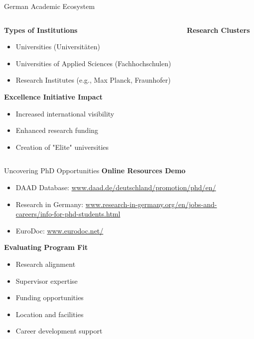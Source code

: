 \documentclass[aspectratio=169,10pt]{beamer}
\begin{document}
\begin{frame}{German Academic Ecosystem}
\begin{columns}[T]
    \begin{column}{0.5\textwidth}
        \textbf{Types of Institutions}
        \begin{itemize}
            \item Universities (Universitäten)
            \item Universities of Applied Sciences (Fachhochschulen)
            \item Research Institutes (e.g., Max Planck, Fraunhofer)
        \end{itemize}
        \textbf{Excellence Initiative Impact}
        \begin{itemize}
            \item Increased international visibility
            \item Enhanced research funding
            \item Creation of "Elite" universities
        \end{itemize}
    \end{column}
    \begin{column}{0.5\textwidth}
        \textbf{Research Clusters}
    \end{column}
\end{columns}
\end{frame}

\begin{frame}{Uncovering PhD Opportunities}
\textbf{Online Resources Demo}
\begin{itemize}
    \item DAAD Database: \url{www.daad.de/deutschland/promotion/phd/en/}
    \item Research in Germany: \url{www.research-in-germany.org/en/jobs-and-careers/info-for-phd-students.html}
    \item EuroDoc: \url{www.eurodoc.net/}
\end{itemize}

\vspace{0.5cm}

\textbf{Evaluating Program Fit}
\begin{itemize}
    \item Research alignment
    \item Supervisor expertise
    \item Funding opportunities
    \item Location and facilities
    \item Career development support
\end{itemize}
\end{frame}
\end{document}
